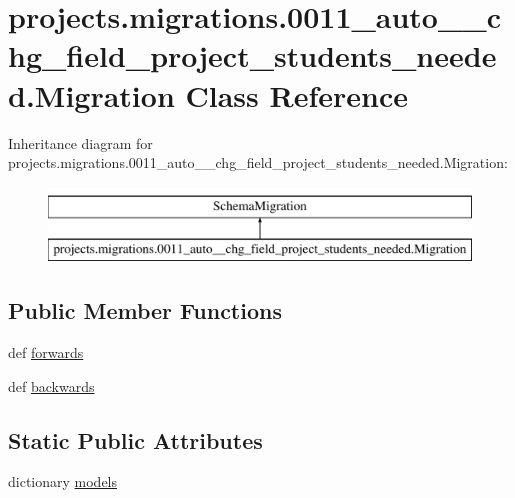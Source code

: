\hypertarget{classprojects_1_1migrations_1_10011__auto____chg__field__project__students__needed_1_1_migration}{\section{projects.\-migrations.0011\-\_\-auto\-\_\-\-\_\-chg\-\_\-field\-\_\-project\-\_\-students\-\_\-needed.Migration Class Reference}
\label{classprojects_1_1migrations_1_10011__auto____chg__field__project__students__needed_1_1_migration}
}
Inheritance diagram for projects.\-migrations.0011\-\_\-auto\-\_\-\-\_\-chg\-\_\-field\-\_\-project\-\_\-students\-\_\-needed.Migration\-:\begin{figure}[H]
\begin{center}
\leavevmode
\includegraphics[height=2.000000cm]{classprojects_1_1migrations_1_10011__auto____chg__field__project__students__needed_1_1_migration}
\end{center}
\end{figure}
\subsection*{Public Member Functions}
\begin{DoxyCompactItemize}
\item 
def \hyperlink{classprojects_1_1migrations_1_10011__auto____chg__field__project__students__needed_1_1_migration_a97b02875d2ea504110c4832c13b5a611}{forwards}
\item 
def \hyperlink{classprojects_1_1migrations_1_10011__auto____chg__field__project__students__needed_1_1_migration_a1a47d499e1d9b1e6768dd11ce3e0c915}{backwards}
\end{DoxyCompactItemize}
\subsection*{Static Public Attributes}
\begin{DoxyCompactItemize}
\item 
dictionary \hyperlink{classprojects_1_1migrations_1_10011__auto____chg__field__project__students__needed_1_1_migration_a1642da397d0123bedb7e2ae0fa21395c}{models}
\end{DoxyCompactItemize}


